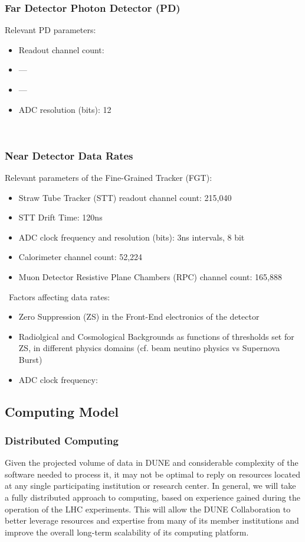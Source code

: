 \subsubsection{Far Detector Photon Detector (PD)}
Relevant  PD parameters:
\begin{itemize}
\item Readout channel count: 
\item ---
\item ---
\item ADC resolution (bits): 12
\end{itemize}
\

\subsubsection{Near Detector Data Rates}
Relevant parameters of the Fine-Grained Tracker (FGT):
\begin{itemize}
\item   Straw Tube Tracker (STT) readout channel count: 215,040
\item STT Drift Time: 120ns
\item ADC clock frequency and resolution (bits): 3ns intervals, 8 bit
\item Calorimeter channel count: 52,224
\item Muon Detector Resistive Plane Chambers (RPC) channel count: 165,888
\end{itemize}
\
Factors affecting data rates:
\begin{itemize}
\item Zero Suppression (ZS)  in the Front-End electronics of the detector
\item Radiolgical and Cosmological Backgrounds as functions of thresholds set for ZS, in different physics domains (cf. beam neutino physics vs Supernova Burst)
\item ADC clock frequency:
\end{itemize}

\subsection{Computing Model}
\label{sec:detectors-sc-infrastructure-computing-model}

\subsubsection{Distributed Computing}

Given the projected volume of  data in DUNE and considerable complexity of the software needed to process it, it may not be optimal to reply on resources located at any single
participating institution or research center. In general, we will take a fully distributed approach to computing, based on experience gained during the operation of the LHC experiments.
This will allow the DUNE Collaboration to better leverage resources and expertise from many of its member institutions and improve the overall long-term scalability of its computing
platform.


